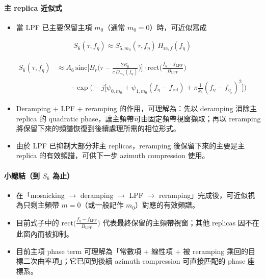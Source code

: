 \documentclass[11pt]{article}
\providecommand{\tightlist}{%
  \setlength{\itemsep}{0pt}\setlength{\parskip}{0pt}}
\begin{document}
\hypertarget{ux4e3b-replica-ux8fd1ux4f3cux5f0f-1}{%
\paragraph{主 replica
近似式}\label{ux4e3b-replica-ux8fd1ux4f3cux5f0f-1}}

\begin{itemize}
\tightlist
\item
  當 LPF 已主要保留主項 \(m_0\)（通常 \(m_0=0\)）時，可近似寫成
\end{itemize}

\begin{equation}
\begin{aligned}
S_6(\tau,f_\eta)\approx S_{5,m_0}(\tau,f_\eta)\,H_{\mathrm{re},f}(f_\eta)
\end{aligned}
\end{equation}

\begin{equation}
\begin{aligned}
S_6(\tau,f_\eta)
&\approx
A_6\,
\mathrm{sinc}\biggl[B_r\biggl(\tau-\frac{2R_0}{c\,D_{m_0}(f_\eta)}\biggr)\biggr]
\cdot \mathrm{rect}\biggl(\frac{f_\eta-f_{\mathrm{LPF}}}{B_{\mathrm{LPF}}}\biggr)\\
&\qquad \cdot
\exp\biggl(-j\biggl[\psi_{0,m_0}+\psi_{1,m_0}(f_\eta-f_{\mathrm{ref}})+\pi\frac{1}{k_s}(f_\eta-f_{\eta_c})^2\biggr]\biggr)
\end{aligned}
\end{equation}

\begin{itemize}
\tightlist
\item
  Deramping + LPF + reramping 的作用，可理解為：先以 deramping 消除主
  replica 的 quadratic phase，讓主頻帶可由固定頻帶視窗擷取；再以
  reramping 將保留下來的頻譜恢復到後續處理所需的相位形式。
\item
  由於 LPF 已抑制大部分非主 replicas，reramping 後保留下來的主要是主
  replica 的有效頻譜，可供下一步 azimuth compression 使用。
\end{itemize}

\hypertarget{ux5c0fux7e3dux7d50ux5230-s_6-ux70baux6b62}{%
\paragraph{\texorpdfstring{小總結（到 \(S_6\)
為止）}{小總結（到 S\_6 為止）}}\label{ux5c0fux7e3dux7d50ux5230-s_6-ux70baux6b62}}

\begin{itemize}
\tightlist
\item
  在「mosaicking \(\rightarrow\) deramping \(\rightarrow\) LPF
  \(\rightarrow\) reramping」完成後，可近似視為只剩主頻帶
  \(m=0\)（或一般記作 \(m_0\)）對應的有效頻譜。
\item
  目前式子中的
  \(\mathrm{rect}\biggl(\frac{f_\eta-f_{\mathrm{LPF}}}{B_{\mathrm{LPF}}}\biggr)\)
  代表最終保留的主頻帶視窗；其他 replicas 因不在此窗內而被抑制。
\item
  目前主項 phase term 可理解為「常數項 + 線性項 + 被 reramping
  乘回的目標二次曲率項」；它已回到後續 azimuth compression 可直接匹配的
  phase 座標系。
\end{itemize}
\end{document}
